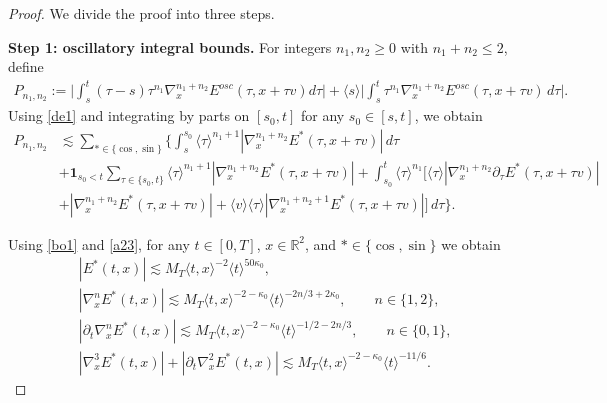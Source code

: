 \documentclass[10pt,a4paper]{amsart}
\def\R{{\mathbb R}}
\theoremstyle{plain}
\begin{document}
\begin{proof} We divide the proof into three steps.
	\medskip
	
	\textbf{Step 1: oscillatory integral bounds.} For integers $n_1,n_2\ge0$ with $n_1+n_2\le2$, define
	\begin{align*}
		P_{n_1,n_2}	:=	\Big|\int_s^t(\tau-s) \tau^{n_1}\nabla_{x}^{n_1+n_2}E^{osc}(\tau,x+\tau v)d\tau\Big|+\langle s\rangle\Big|\int_s^t \tau^{n_1}\nabla_{x}^{n_1+n_2}E^{osc}(\tau,x+\tau v)\,d\tau\Big|.
	\end{align*}
	Using \eqref{de1} and integrating by parts on $[s_0,t]$ for any $s_0\in[s,t]$, we obtain
	\begin{equation}\label{Pbounds1}
		\begin{split}
			P_{n_1,n_2}	&\lesssim \sum_{\ast\in\{\cos,\sin\}}\Big\{\int_s^{s_0} \langle \tau\rangle^{n_1+1}|\nabla_{x}^{n_1+n_2}E^{\ast}(\tau,x+\tau v)|\,d\tau\\
			&+\mathbf 1_{s_0<t}\sum_{\tau\in\{s_0,t\}} \langle \tau\rangle^{n_1+1}|\nabla_{x}^{n_1+n_2} E^{\ast}(\tau,x+\tau v)|+\int_{s_0}^{t}\langle \tau\rangle^{n_1}\Big[\langle \tau\rangle|\nabla_{x}^{n_1+n_2}\partial_\tau E^{\ast}(\tau,x+\tau v)|\\
			&+|\nabla_{x}^{n_1+n_2} E^{\ast}(\tau,x+\tau v)|+\langle v\rangle\langle \tau\rangle|\nabla_{x}^{n_1+n_2+1} E^{\ast}(\tau,x+\tau v)|\Big]\,d\tau\Big\}.
		\end{split}
	\end{equation}
	
	Using \eqref{bo1} and \eqref{a23}, for any $t\in[0,T]$, $x\in\R^2$, and $\ast\in\{\cos,\sin\}$ we obtain
	\begin{equation}\label{Ebounds1}
		\begin{split}
			&|E^\ast(t,x)|\lesssim M_T\langle t,x\rangle^{-2}\langle t\rangle^{50\kappa_0},\\
			&|\nabla_x^n E^\ast(t,x)|\lesssim M_T\langle t,x\rangle^{-2-\kappa_0}\langle t\rangle^{-2n/3+2\kappa_0},\qquad n\in\{1,2\},\\
			&|\partial_t\nabla_x^n E^\ast(t,x)|\lesssim M_T\langle t,x\rangle^{-2-\kappa_0}\langle t\rangle^{-1/2-2n/3},\qquad n\in\{0,1\},\\
			&|\nabla_x^3 E^\ast(t,x)|+|\partial_t\nabla_x^2 E^\ast(t,x)|\lesssim M_T\langle t,x\rangle^{-2-\kappa_0}\langle t\rangle^{-11/6}.
		\end{split}
	\end{equation}
	

\end{proof}
\end{document}
